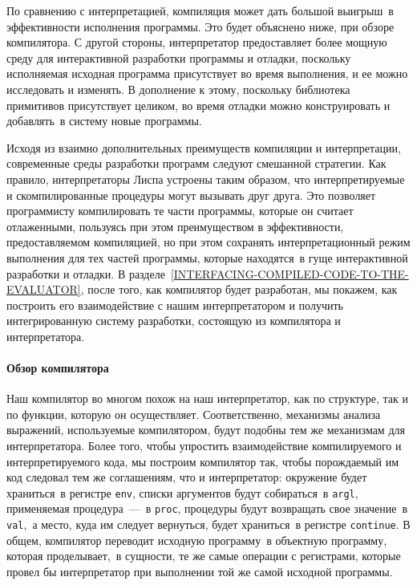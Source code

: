 По сравнению с интерпретацией, компиляция может дать
большой выигрыш~в эффективности исполнения программы. Это будет
объяснено ниже, при обзоре компилятора.  С другой стороны,
интерпретатор предоставляет более мощную среду для интерактивной
разработки программы и отладки, поскольку исполняемая исходная
программа присутствует во время выполнения, и ее можно исследовать и
изменять.  В дополнение к этому, поскольку библиотека примитивов
присутствует целиком, во время отладки можно конструировать и
добавлять~в систему новые программы.

Исходя из взаимно дополнительных преимуществ компиляции и
интерпретации, современные среды разработки программ следуют смешанной
стратегии.  Как правило, интерпретаторы Лиспа устроены таким образом,
что интерпретируемые и скомпилированные процедуры могут вызывать друг
друга.  Это позволяет программисту компилировать те части программы,
которые он считает отлаженными, пользуясь при этом преимуществом в
эффективности, предоставляемом компиляцией, но при этом сохранять
интерпретационный режим выполнения для тех частей программы, которые
находятся~в гуще интерактивной разработки и отладки.  В 
разделе~\ref{INTERFACING-COMPILED-CODE-TO-THE-EVALUATOR}, после
того, как компилятор будет разработан, мы покажем, как построить его
взаимодействие с нашим интерпретатором и получить интегрированную
систему разработки, состоящую из компилятора и интерпретатора.

\paragraph{Обзор компилятора}

Наш компилятор во многом похож на наш интерпретатор, как
по структуре, так и по функции, которую он осуществляет.
Соответственно, механизмы анализа выражений, используемые
компилятором, будут подобны тем же механизмам для
интерпретатора.  Более того, чтобы упростить взаимодействие
компилируемого и интерпретируемого кода, мы построим компилятор так,
чтобы порождаемый им код следовал тем же соглашениям, что и
интерпретатор:  окружение будет храниться~в регистре {\tt env},
списки аргументов будут собираться~в {\tt argl}, применяемая
процедура~---~в {\tt proc}, процедуры будут возвращать свое
значение~в {\tt val},~а место, куда им следует вернуться, будет
храниться~в регистре {\tt continue}.  В общем, компилятор
переводит исходную программу~в объектную программу, которая
проделывает,~в сущности, те же самые операции с регистрами, которые
провел бы интерпретатор при выполнении той же самой исходной
программы.

